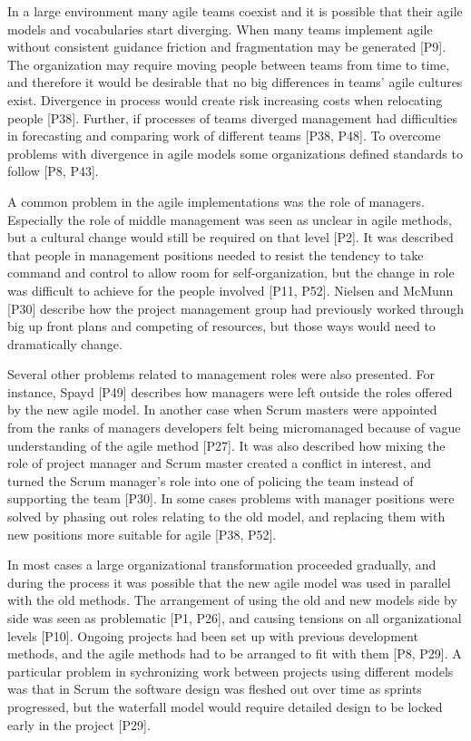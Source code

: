 \documentclass[preprint,authoryear,12pt]{elsarticle}
\begin{document}

In a large environment many agile teams coexist and it is possible that their
agile models and vocabularies start diverging. When many teams implement agile
without consistent guidance friction and fragmentation may be generated [P9].
The organization may require moving people between teams from time to time, and
therefore it would be desirable that no big differences in teams' agile cultures
exist. Divergence in process would create risk increasing costs when relocating
people [P38]. Further, if processes of teams diverged management had
difficulties in forecasting and comparing work of different teams [P38, P48].
To overcome problems with divergence in agile models some organizations defined
standards to follow [P8, P43].


A common problem in the agile implementations was the role of managers.
Especially the role of middle management was seen as unclear in agile
methods, but a cultural change would still be required on that level [P2].
It was described that people in management positions needed to resist the
tendency to take command and control to allow room for self-organization, but
the change in role was difficult to achieve for the people involved [P11, P52].
Nielsen and McMunn [P30] describe how the project management group had
previously worked through big up front plans and competing of resources, but
those ways would need to dramatically change.


Several other problems related to management roles were also presented. For
instance, Spayd [P49] describes how managers were left outside the roles offered
by the new agile model. In another case when Scrum masters were appointed from
the ranks of managers developers felt being micromanaged because of vague
understanding of the agile method [P27]. It was also described how mixing the
role of project manager and Scrum master created a conflict in interest, and
turned the Scrum manager's role into one of policing the team instead of
supporting the team [P30]. In some cases problems with manager positions were
solved by phasing out roles relating to the old model, and replacing them with
new positions more suitable for agile [P38, P52].


In most cases a large organizational transformation proceeded gradually, and
during the process it was possible that the new agile model was used in parallel
with the old methods. The arrangement of using the old and new models side by
side was seen as problematic [P1, P26], and causing tensions on all organizational
levels [P10]. Ongoing projects had been set up with previous development
methods, and the agile methods had to be arranged to fit with them [P8, P29].
A particular problem in sychronizing work between projects using different
models was that in Scrum the software design was fleshed out over time as
sprints progressed, but the waterfall model would require detailed design to be
locked early in the project [P29].
\end{document}
